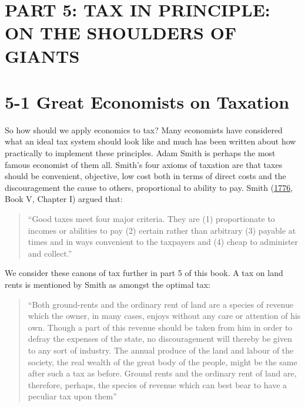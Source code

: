 \documentclass[]{tufte-handout}
\begin{document}
\hypertarget{part-5-tax-in-principle-on-the-shoulders-of-giants}{%
\section{PART 5: TAX IN PRINCIPLE: ON THE SHOULDERS OF
GIANTS}\label{part-5-tax-in-principle-on-the-shoulders-of-giants}}

\hypertarget{great-economists-on-taxation}{%
\section{5-1 Great Economists on
Taxation}\label{great-economists-on-taxation}}

So how should we apply economics to tax? Many economists have considered
what an ideal tax system should look like and much has been written
about how practically to implement these principles. Adam Smith is
perhaps the most famous economist of them all. Smith's four axioms of
taxation are that taxes should be convenient, objective, low cost both
in terms of direct costs and the discouragement the cause to others,
proportional to ability to pay. Smith
(\protect\hyperlink{ref-smith1776wealth}{1776}, Book V, Chapter I)
argued that:

\begin{quote}
``Good taxes meet four major criteria. They are (1) proportionate to
incomes or abilities to pay (2) certain rather than arbitrary (3)
payable at times and in ways convenient to the taxpayers and (4) cheap
to administer and collect.''
\end{quote}

We consider these canons of tax further in part 5 of this book. A tax on
land rents is mentioned by Smith as amongst the optimal tax:

\begin{quote}
``Both ground-rents and the ordinary rent of land are a species of
revenue which the owner, in many cases, enjoys without any care or
attention of his own. Though a part of this revenue should be taken from
him in order to defray the expenses of the state, no discouragement will
thereby be given to any sort of industry. The annual produce of the land
and labour of the society, the real wealth of the great body of the
people, might be the same after such a tax as before. Ground rents and
the ordinary rent of land are, therefore, perhaps, the species of
revenue which can best bear to have a peculiar tax upon them''
\end{quote}
\end{document}

